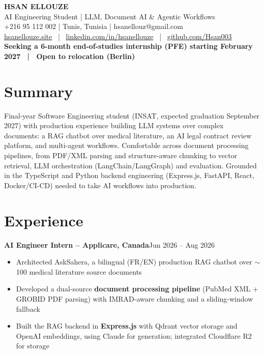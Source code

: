 \documentclass[10pt,a4paper]{article}
\newcommand{\entry}[2]{\vspace{1pt}\noindent\textbf{#1}\hfill{\color{muted}#2}\par}
\begin{document}
\begin{center}
  {\LARGE\bfseries HSAN ELLOUZE}\\[2pt]
  {\color{muted} AI Engineering Student | LLM, Document AI \& Agentic Workflows}\\[2pt]
  {\footnotesize +216 95 112 002 | Tunis, Tunisia | hsanellouz@gmail.com}\\[1pt]
  {\footnotesize \href{https://hsanellouze.site}{hsanellouze.site} \ | \ \href{https://linkedin.com/in/hsanellouze}{linkedin.com/in/hsanellouze} \ | \ \href{https://github.com/Hsan003}{github.com/Hsan003}}\\[3pt]
  {\footnotesize\bfseries Seeking a 6-month end-of-studies internship (PFE) starting February 2027 \ | \ Open to relocation (Berlin)}
\end{center}

\section{Summary}
Final-year Software Engineering student (INSAT, expected graduation September 2027) with production experience building LLM systems over complex documents: a RAG chatbot over medical literature, an AI legal contract review platform, and multi-agent workflows. Comfortable across document processing pipelines, from PDF/XML parsing and structure-aware chunking to vector retrieval, LLM orchestration (LangChain/LangGraph) and evaluation. Grounded in the TypeScript and Python backend engineering (Express.js, FastAPI, React, Docker/CI-CD) needed to take AI workflows into production.

\section{Experience}
\entry{AI Engineer Intern -- Applicare, Canada}{Jun 2026 -- Aug 2026}
\begin{itemize}
  \item Architected AskSahera, a bilingual (FR/EN) production RAG chatbot over $\sim$100 medical literature source documents
  \item Developed a dual-source \textbf{document processing pipeline} (PubMed XML + GROBID PDF parsing) with IMRAD-aware chunking and a sliding-window fallback
  \item Built the RAG backend in \textbf{Express.js} with Qdrant vector storage and OpenAI embeddings, using Claude for generation; integrated Cloudflare R2 for storage
\end{itemize}
\end{document}

